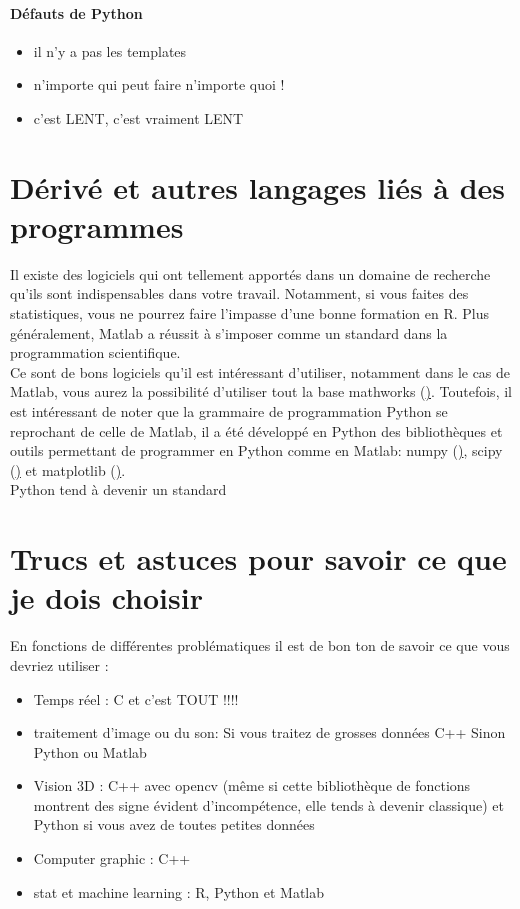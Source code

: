 \paragraph{Défauts de Python}
\begin{itemize}
\item il n'y a pas les templates
\item n'importe qui peut faire n'importe quoi !
\item c'est LENT, c'est vraiment LENT
\end{itemize}

\section{Dérivé et autres langages liés à des programmes}

Il existe des logiciels qui ont tellement apportés dans un domaine de recherche qu'ils sont 
indispensables dans votre travail. Notamment, si vous faites des statistiques, vous ne pourrez
 faire l'impasse d'une bonne formation en R. Plus généralement, Matlab a réussit à s'imposer 
comme un standard dans la programmation scientifique.\\

Ce sont de bons logiciels qu'il est intéressant d'utiliser, notamment dans le cas de Matlab, 
vous aurez la possibilité d'utiliser tout la base mathworks 
(\href{http://www.mathworks.fr/matlabcentral/fileexchange}). Toutefois, il est intéressant 
de noter que la grammaire de programmation Python se reprochant de celle de Matlab, il a 
été développé en Python des bibliothèques et outils permettant de programmer en Python comme en Matlab: 
numpy (\href{http://www.numpy.org/}),
 scipy (\href{http://www.scipy.org/}) et matplotlib (\href{http://matplotlib.org/}).\\

Python tend à devenir un standard 


\section{Trucs et astuces pour savoir ce que je dois choisir}

En fonctions de différentes problématiques il est de bon ton de savoir ce que vous devriez utiliser :

\begin{itemize}
\item Temps réel : C et c'est TOUT !!!!
\item traitement d'image ou du son: Si vous traitez de grosses données C++ Sinon Python ou Matlab
\item Vision 3D : C++ avec opencv (même si cette bibliothèque de fonctions montrent des signe 
évident d'incompétence, elle tends à devenir classique) et Python si vous avez de toutes petites données
\item Computer graphic : C++ 
\item stat et machine learning : R, Python et Matlab
\end{itemize}  

